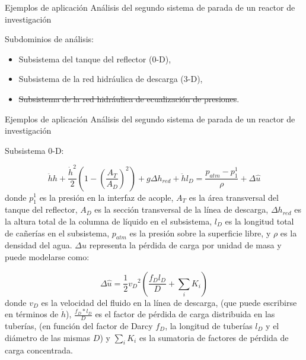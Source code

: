\begin{frame}
{Ejemplos de aplicación}
{Análisis del segundo sistema de parada de un reactor de investigación}

Subdominios de análisis:

\begin{itemize}
\item Subsistema del tanque del reflector (0-D),
\item Subsistema de la red hidráulica de descarga (3-D),
\item \sout{Subsistema de la red hidráulica de ecualización de presiones}.
\end{itemize}

\end{frame}


\footnotesize
\begin{frame}
{Ejemplos de aplicación}
{Análisis del segundo sistema de parada de un reactor de investigación}

Subsistema 0-D:

\begin{equation*}
\ddot{h} h + \frac{\dot{h}^2}{2}\left( 1- \left(\frac{A_T}{A_D} \right)^2 \right) + g \Delta h_{red} + \ddot{h}  l_D = 
\frac{p_{atm}-p_1^1}{\rho} + \Delta \hat{u}
\label{eq-tanque}
\end{equation*}
donde $p_1^1$ es la presión en la interfaz de acople,
$A_T$ es la área transversal del tanque del reflector, 
$A_D$ es la sección transversal de la línea de descarga,
$\Delta h_{red}$ es la altura total de la columna de líquido en el subsistema,
$l_D$ es la longitud total de cañerías en el subsistema,
$p_{atm}$ es la presión sobre la superficie libre,
y $\rho$ es la densidad del agua.
$\Delta \hat{u}$ representa la pérdida de carga por unidad de masa y puede modelarse como:

\begin{equation*}
\Delta \hat{u} = \frac {1} {2} {v_D}^2 \left( \frac {f_D l_D}{D} + \sum_i K_i \right)
\end{equation*}
donde $v_D$ es la velocidad del fluido en la línea de descarga,
(que puede escribirse en términos de $\dot{h}$),
$\frac {f_D*l_D}{D}$ es el factor de pérdida de carga distribuida en las tuberías,
(en función del factor de Darcy $f_D$, la longitud de tuberías $l_D$ y el diámetro de las mismas $D$)
y $\sum_i K_i$ es la sumatoria de factores de pérdida de carga concentrada.

\end{frame}

